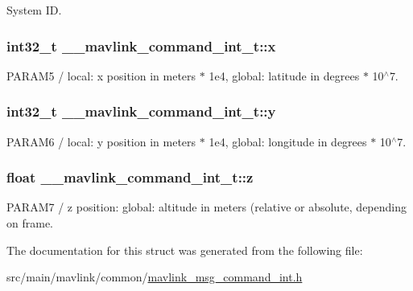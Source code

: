 System I\+D. 

\hypertarget{struct____mavlink__command__int__t_a31099780f7fa0bcbf0a10179279471a2}{
\subsubsection[{x}]{\setlength{\rightskip}{0pt plus 5cm}int32\+\_\+t \+\_\+\+\_\+mavlink\+\_\+command\+\_\+int\+\_\+t\+::x}}\label{struct____mavlink__command__int__t_a31099780f7fa0bcbf0a10179279471a2}


P\+A\+R\+A\+M5 / local\+: x position in meters $\ast$ 1e4, global\+: latitude in degrees $\ast$ 10$^\wedge$7. 

\hypertarget{struct____mavlink__command__int__t_a1316d8a8c1b2b2adb4fee1097615a2ba}{
\subsubsection[{y}]{\setlength{\rightskip}{0pt plus 5cm}int32\+\_\+t \+\_\+\+\_\+mavlink\+\_\+command\+\_\+int\+\_\+t\+::y}}\label{struct____mavlink__command__int__t_a1316d8a8c1b2b2adb4fee1097615a2ba}


P\+A\+R\+A\+M6 / local\+: y position in meters $\ast$ 1e4, global\+: longitude in degrees $\ast$ 10$^\wedge$7. 

\hypertarget{struct____mavlink__command__int__t_a1eb7cb747b12d83958b4efcd65c8f060}{
\subsubsection[{z}]{\setlength{\rightskip}{0pt plus 5cm}float \+\_\+\+\_\+mavlink\+\_\+command\+\_\+int\+\_\+t\+::z}}\label{struct____mavlink__command__int__t_a1eb7cb747b12d83958b4efcd65c8f060}


P\+A\+R\+A\+M7 / z position\+: global\+: altitude in meters (relative or absolute, depending on frame. 



The documentation for this struct was generated from the following file\+:\begin{DoxyCompactItemize}
\item 
src/main/mavlink/common/\hyperlink{mavlink__msg__command__int_8h}{mavlink\+\_\+msg\+\_\+command\+\_\+int.\+h}\end{DoxyCompactItemize}

